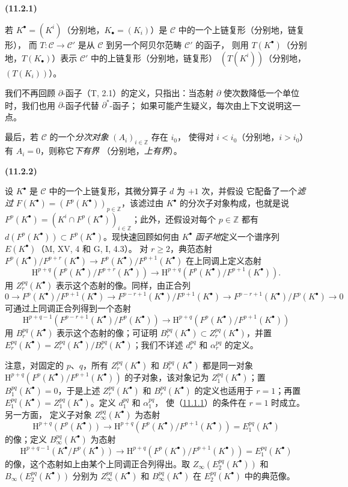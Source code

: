 \documentclass[UTF8,fontset=none,11pt,oneside,openany]{ctexbook}
\newenvironment{env}[1][]{%
  \par\medskip\noindent\textbf{(#1)}\ %
}{\par}
\newcommand{\oldpage}[2][]{%
  \hypertarget{ega-source-page-#1-#2}{}%
  \marginnote{\scriptsize\textbf{#1}~|~#2}\ignorespaces}
\let\EGAOriginalLabel\label
\renewcommand{\label}[1]{\phantomsection\EGAOriginalLabel{#1}}
\begin{document}
\begin{env}[11.2.1]
若 $K^\bullet=(K^i)$（分别地，$K_\bullet=(K_i)$）是 $\mathcal C$ 中的一个上链复形（分别地，链复形），
而 $T:\mathcal C\to\mathcal C'$ 是从 $\mathcal C$ 到另一个阿贝尔范畴 $\mathcal C'$ 的函子，
则用 $T(K^\bullet)$（分别地，$T(K_\bullet)$）表示 $\mathcal C'$ 中的上链复形（分别地，链复形）
$(T(K^i))$（分别地，$(T(K_i))$）。

我们不再回顾 $\partial$-函子（T, 2.1）的定义，只指出：当态射 $\partial$
使次数降低一个单位时，我们也用 $\partial$-函子代替 $\partial^*$-函子；
如果可能产生疑义，每次由上下文说明这一点。

最后，若 $\mathcal C$ 的一个\emph{分次对象} $(A_i)_{i\in\mathbb Z}$ 存在 $i_0$，
使得对 $i<i_0$（分别地，$i>i_0$）有 $A_i=0$，则称它\emph{下有界}
（分别地，\emph{上有界}）。
\end{env}

\begin{env}[11.2.2]
\label{0.11.2.2-fr}
设 $K^\bullet$ 是 $\mathcal C$ 中的一个上链复形，其微分算子 $d$ 为 $+1$ 次，并假设
它配备了一个\emph{滤过} $F(K^\bullet)=(F^p(K^\bullet))_{p\in\mathbb Z}$，该滤过由
$K^\bullet$ 的分次子对象构成，也就是说
\oldpage[0\textsubscript{III}]{28}
$F^p(K^\bullet)=(K^i\cap F^p(K^\bullet))_{i\in\mathbb Z}$；此外，还假设对每个
$p\in\mathbb Z$ 都有 $d(F^p(K^\bullet))\subset F^p(K^\bullet)$。现快速回顾如何由
$K^\bullet$ \emph{函子地}定义一个谱序列 $E(K^\bullet)$（M, XV, 4 和 G, I, 4.3）。
对 $r\geq2$，典范态射
$F^p(K^\bullet)/F^{p+r}(K^\bullet)\to
F^p(K^\bullet)/F^{p+1}(K^\bullet)$ 在上同调上定义态射
\[
  \mathrm H^{p+q}(F^p(K^\bullet)/F^{p+r}(K^\bullet))
  \longrightarrow
  \mathrm H^{p+q}(F^p(K^\bullet)/F^{p+1}(K^\bullet)).
\]
用 $Z_r^{pq}(K^\bullet)$ 表示这个态射的像。同样，由正合列
\[
  0\to F^p(K^\bullet)/F^{p+1}(K^\bullet)
  \to F^{p-r+1}(K^\bullet)/F^{p+1}(K^\bullet)
  \to F^{p-r+1}(K^\bullet)/F^p(K^\bullet)\to0
\]
可通过上同调正合列得到一个态射
\[
  \mathrm H^{p+q-1}(F^{p-r+1}(K^\bullet)/F^p(K^\bullet))
  \longrightarrow
  \mathrm H^{p+q}(F^p(K^\bullet)/F^{p+1}(K^\bullet))
\]
用 $B_r^{pq}(K^\bullet)$ 表示这个态射的像；可证明
$B_r^{pq}(K^\bullet)\subset Z_r^{pq}(K^\bullet)$，并置
$E_r^{pq}(K^\bullet)=Z_r^{pq}(K^\bullet)/B_r^{pq}(K^\bullet)$；我们不详述
$d_r^{pq}$ 和 $\alpha_r^{pq}$ 的定义。

注意，对固定的 $p$、$q$，所有 $Z_r^{pq}(K^\bullet)$ 和 $B_r^{pq}(K^\bullet)$
都是同一对象
$\mathrm H^{p+q}(F^p(K^\bullet)/F^{p+1}(K^\bullet))$ 的子对象，该对象记为
$Z_1^{pq}(K^\bullet)$；置 $B_1^{pq}(K^\bullet)=0$，于是上述 $Z_r^{pq}(K^\bullet)$
和 $B_r^{pq}(K^\bullet)$ 的定义也适用于 $r=1$；再置
$E_1^{pq}(K^\bullet)=Z_1^{pq}(K^\bullet)$。定义 $d_1^{pq}$ 和 $\alpha_1^{pq}$，
使（\hyperref[0.11.1.1-fr]{11.1.1}）的条件在 $r=1$ 时成立。另一方面，
定义子对象 $Z_\infty^{pq}(K^\bullet)$ 为态射
\[
  \mathrm H^{p+q}(F^p(K^\bullet))\longrightarrow
  \mathrm H^{p+q}(F^p(K^\bullet)/F^{p+1}(K^\bullet))
  =E_1^{pq}(K^\bullet)
\]
的像；定义 $B_\infty^{pq}(K^\bullet)$ 为态射
\[
  \mathrm H^{p+q-1}(K^\bullet/F^p(K^\bullet))\longrightarrow
  \mathrm H^{p+q}(F^p(K^\bullet)/F^{p+1}(K^\bullet))
  =E_1^{pq}(K^\bullet)
\]
的像，这个态射如上由某个上同调正合列得出。取
$Z_\infty(E_2^{pq}(K^\bullet))$ 和 $B_\infty(E_2^{pq}(K^\bullet))$ 分别为
$Z_\infty^{pq}(K^\bullet)$ 和 $B_\infty^{pq}(K^\bullet)$ 在 $E_2^{pq}(K^\bullet)$ 中的典范像。


\end{env}
\end{document}
